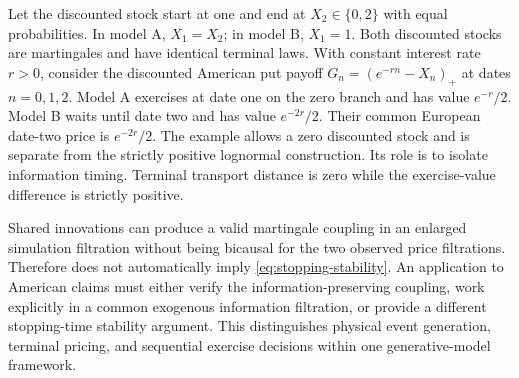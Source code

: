 \begin{example}\label{ex:early-information}
Let the discounted stock start at one and end at $X_2\in\{0,2\}$ with equal probabilities. In model A, $X_1=X_2$; in model B, $X_1=1$. Both discounted stocks are martingales and have identical terminal laws. With constant interest rate $r>0$, consider the discounted American put payoff
$G_n=(e^{-rn}-X_n)_+$ at dates $n=0,1,2$. Model A exercises at date one on the zero branch and has value $e^{-r}/2$. Model B waits until date two and has value $e^{-2r}/2$. Their common European date-two price is $e^{-2r}/2$.
The example allows a zero discounted stock and is separate from the strictly positive lognormal construction. Its role is to isolate information timing. Terminal transport distance is zero while the exercise-value difference is strictly positive.
\end{example}

Shared innovations can produce a valid martingale coupling in an enlarged simulation filtration without being bicausal for the two observed price filtrations. Therefore  does not automatically imply \eqref{eq:stopping-stability}. An application to American claims must either verify the information-preserving coupling, work explicitly in a common exogenous information filtration, or provide a different stopping-time stability argument. This distinguishes physical event generation, terminal pricing, and sequential exercise decisions within one generative-model framework.
